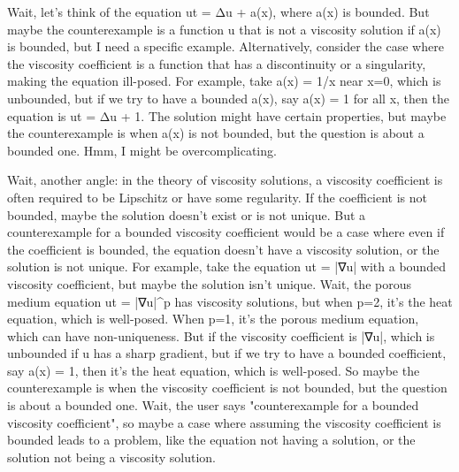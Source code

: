 Wait, let's think of the equation ut = Δu + a(x), where a(x) is bounded. But maybe the counterexample is a function u that is not a viscosity solution if a(x) is bounded, but I need a specific example. Alternatively, consider the case where the viscosity coefficient is a function that has a discontinuity or a singularity, making the equation ill-posed. For example, take a(x) = 1/x near x=0, which is unbounded, but if we try to have a bounded a(x), say a(x) = 1 for all x, then the equation is ut = Δu + 1. The solution might have certain properties, but maybe the counterexample is when a(x) is not bounded, but the question is about a bounded one. Hmm, I might be overcomplicating.

Wait, another angle: in the theory of viscosity solutions, a viscosity coefficient is often required to be Lipschitz or have some regularity. If the coefficient is not bounded, maybe the solution doesn't exist or is not unique. But a counterexample for a bounded viscosity coefficient would be a case where even if the coefficient is bounded, the equation doesn't have a viscosity solution, or the solution is not unique. For example, take the equation ut = |∇u| with a bounded viscosity coefficient, but maybe the solution isn't unique. Wait, the porous medium equation ut = |∇u|^p has viscosity solutions, but when p=2, it's the heat equation, which is well-posed. When p=1, it's the porous medium equation, which can have non-uniqueness. But if the viscosity coefficient is |∇u|, which is unbounded if u has a sharp gradient, but if we try to have a bounded coefficient, say a(x) = 1, then it's the heat equation, which is well-posed. So maybe the counterexample is when the viscosity coefficient is not bounded, but the question is about a bounded one. Wait, the user says "counterexample for a bounded viscosity coefficient", so maybe a case where assuming the viscosity coefficient is bounded leads to a problem, like the equation not having a solution, or the solution not being a viscosity solution.

